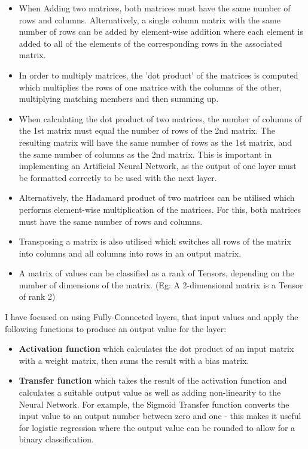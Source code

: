 \documentclass[./project-report/src/latex/project-report.tex]{subfiles}
\begin{document}
\begin{itemize}
    \item When Adding two matrices, both matrices must have the same number of rows and columns. Alternatively, a single column matrix with the same number of rows can be 
          added by element-wise addition where each element is added to all of the elements of the corresponding rows in the associated matrix.
    \item In order to multiply matrices, the 'dot product' of the matrices is computed which multiplies the rows of one matrice with the columns of the other, multiplying 
          matching members and then summing up.
    \item When calculating the dot product of two matrices, the number of columns of the 1st matrix must equal the number of rows of the 2nd matrix. The resulting matrix will 
          have the same number of rows as the 1st matrix, and the same number of columns as the 2nd matrix. This is important in implementing an Artificial Neural Network, 
          as the output of one layer must be formatted correctly to be used with the next layer.
    \item Alternatively, the Hadamard product of two matrices can be utilised which performs element-wise multiplication of the matrices. For this, both matrices 
          must have the same number of rows and columns.
    \item Transposing a matrix is also utilised which switches all rows of the matrix into columns and all columns into rows in an output matrix.
    \item A matrix of values can be classified as a rank of Tensors, depending on the number of dimensions of the matrix. (Eg: A 2-dimensional matrix is a Tensor of 
          rank 2)
\end{itemize}

I have focused on using Fully-Connected layers, that input values and apply the following functions to produce an output value for the layer:

\begin{itemize}
    \item \textbf{Activation function} which calculates the dot product of an input matrix with a weight matrix, then sums the result with a bias matrix.
    \item \textbf{Transfer function} which takes the result of the activation function and calculates a suitable output value as well as adding non-linearity to the Neural 
		  Network. 
          For example, the Sigmoid Transfer function converts the input value to an output number between zero and one - this makes it useful for logistic regression where the output value 
          can be rounded to allow for a binary classification.
\end{itemize}
\end{document}
